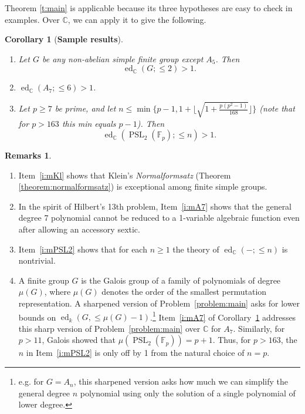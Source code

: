 \documentclass[11pt]{amsart}
\newtheorem{corollary}[theorem]{Corollary}
\theoremstyle{definition}
\newtheorem{remarks}[theorem]{Remarks}
\numberwithin{equation}{section}
\newcommand{\Cb}{\mathbb{C}}
\newcommand{\F}{\mathbb{F}}
\DeclareMathOperator{\PSL}{PSL}
\DeclareMathOperator{\ed}{ed}
\begin{document}
Theorem \ref{t:main} is applicable because its three hypotheses are easy to check in examples.  Over $\Cb$, we can apply it to give the following.

\begin{corollary}[{\bf Sample results}]
\label{cor:main5}\mbox{}
\begin{enumerate}
\item\label{i:mKl}  Let $G$ be any non-abelian simple finite group except $A_5$. Then 
\[\ed_{\Cb}(G;\le 2)>1.\]
\item\label{i:mA7} $\ed_{\Cb}(A_7;\leq 6)>1$. 
\item\label{i:mPSL2} Let $p\geq 7$ be prime, and let $n\le\min\{p-1,1+\lfloor \sqrt{1+\frac{p(p^2-1)}{168}}\rfloor\}$ (note that for $p>163$ this min equals $p-1$).  Then \[\ed_{\Cb}(\PSL_2(\F_p);\le n)>1.\]
\end{enumerate}
\end{corollary}

\begin{remarks}\mbox{}
\begin{enumerate}
    \item Item~\ref{i:mKl} shows that Klein's {\it Normalformsatz} (Theorem \ref{theorem:normalformsatz}) is exceptional among finite simple groups. 
    \item In the spirit of Hilbert's 13th problem, Item~\ref{i:mA7} shows that the general degree 7 polynomial cannot be reduced to a 1-variable algebraic function even after allowing an accessory sextic. 
    \item Item~\ref{i:mPSL2} shows that for each $n\geq 1$ the theory of $\ed_{\Cb}(-;\le n)$ is nontrivial. 
    \item A finite group $G$ is the Galois group of a family of polynomials of degree $\mu(G)$, where $\mu(G)$ denotes the order of the smallest permutation representation. A sharpened version of Problem~\ref{problem:main} asks for lower bounds on $\ed_k(G,\le \mu(G)-1)$.\footnote{e.g. for $G=A_n$, this sharpened version asks how much we can simplify the general degree $n$ polynomial using only the solution of a single polynomial of lower degree.}  Item~\ref{i:mA7} of 
    Corollary~\ref{cor:main5} addresses this sharp version of Problem~\ref{problem:main} over $\Cb$ for $A_7$.  Similarly, for $p>11$, Galois showed that $\mu(\PSL_2(\F_p))=p+1$.  Thus, for $p>163$, the 
    $n$ in Item~\ref{i:mPSL2} is only off by 1 from the natural choice of $n=p$.
\end{enumerate}
\end{remarks}
\end{document}
